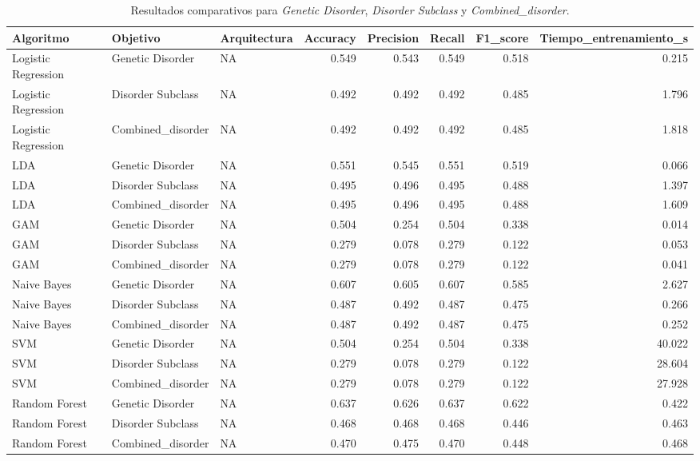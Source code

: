 \documentclass[11pt,a4paper,spanish]{book}
\numberwithin{equation}{chapter}
\numberwithin{figure}{chapter}
\begin{document}
\begin{table}[htbp]
\centering
\scriptsize
\caption{Resultados comparativos para \textit{Genetic Disorder}, \textit{Disorder Subclass} y \textit{Combined\_disorder}.}
\label{tab:resultados_completos}
\begin{tabular}{l l l r r r r r}
\toprule
Algoritmo & Objetivo & Arquitectura & Accuracy & Precision & Recall & F1\_score & Tiempo\_entrenamiento\_s \\
\midrule
Logistic Regression & Genetic Disorder & NA & 0.549 & 0.543 & 0.549 & 0.518 & 0.215 \\
Logistic Regression & Disorder Subclass & NA & 0.492 & 0.492 & 0.492 & 0.485 & 1.796 \\
Logistic Regression & Combined\_disorder & NA & 0.492 & 0.492 & 0.492 & 0.485 & 1.818 \\
LDA & Genetic Disorder & NA & 0.551 & 0.545 & 0.551 & 0.519 & 0.066 \\
LDA & Disorder Subclass & NA & 0.495 & 0.496 & 0.495 & 0.488 & 1.397 \\
LDA & Combined\_disorder & NA & 0.495 & 0.496 & 0.495 & 0.488 & 1.609 \\
GAM & Genetic Disorder & NA & 0.504 & 0.254 & 0.504 & 0.338 & 0.014 \\
GAM & Disorder Subclass & NA & 0.279 & 0.078 & 0.279 & 0.122 & 0.053 \\
GAM & Combined\_disorder & NA & 0.279 & 0.078 & 0.279 & 0.122 & 0.041 \\
Naive Bayes & Genetic Disorder & NA & 0.607 & 0.605 & 0.607 & 0.585 & 2.627 \\
Naive Bayes & Disorder Subclass & NA & 0.487 & 0.492 & 0.487 & 0.475 & 0.266 \\
Naive Bayes & Combined\_disorder & NA & 0.487 & 0.492 & 0.487 & 0.475 & 0.252 \\
SVM & Genetic Disorder & NA & 0.504 & 0.254 & 0.504 & 0.338 & 40.022 \\
SVM & Disorder Subclass & NA & 0.279 & 0.078 & 0.279 & 0.122 & 28.604 \\
SVM & Combined\_disorder & NA & 0.279 & 0.078 & 0.279 & 0.122 & 27.928 \\
Random Forest & Genetic Disorder & NA & 0.637 & 0.626 & 0.637 & 0.622 & 0.422 \\
Random Forest & Disorder Subclass & NA & 0.468 & 0.468 & 0.468 & 0.446 & 0.463 \\
Random Forest & Combined\_disorder & NA & 0.470 & 0.475 & 0.470 & 0.448 & 0.468 \\

\end{tabular}
\end{table}
\end{document}
